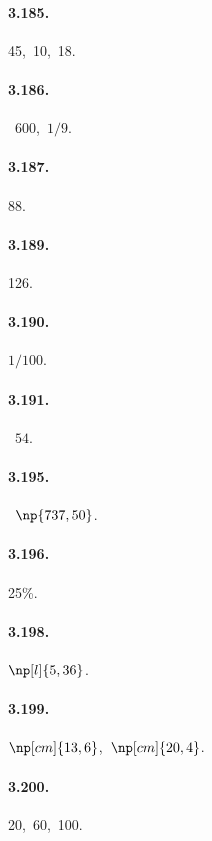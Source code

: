 \begin{multicols}{3}
\paragraph{3.185.} 45,~10,~18.

\paragraph{3.186.} \officialeuro~$600$,~$1/9$.

\paragraph{3.187.} 88.

\paragraph{3.189.} 126.

\paragraph{3.190.} $1/100$.

\paragraph{3.191.} \officialeuro~$54$.

\paragraph{3.195.} \officialeuro~$\np{737,50}$.

\paragraph{3.196.} 25\%.

\paragraph{3.198.} $\np[l]{5,36}$.

\paragraph{3.199.} $\np[cm]{13,6}$,~$\np[cm]{20,4}$.

\paragraph{3.200.} 20{\textdegree},~60{\textdegree},~100{\textdegree}.


\end{multicols}
